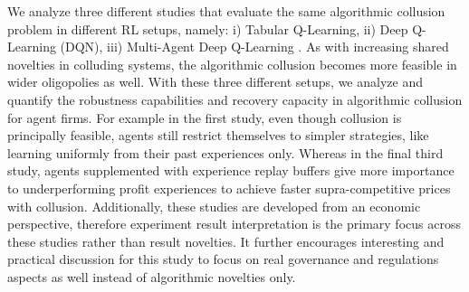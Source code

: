 \documentclass{article}
\begin{document}


We analyze three different studies that evaluate the same algorithmic collusion problem in different RL setups, namely: i) Tabular Q-Learning, ii) Deep Q-Learning (DQN), iii) Multi-Agent Deep Q-Learning \cite{eschenbaum2022robust, hettich2021algorithmic, han2021understanding}.
As with increasing shared novelties in colluding systems, the algorithmic collusion becomes more feasible in wider oligopolies as well.
With these three different setups, we analyze and quantify the robustness capabilities and recovery capacity in algorithmic collusion for agent firms.
For example in the first study, even though collusion is principally feasible, agents still restrict themselves to simpler strategies, like learning uniformly from their past experiences only.
Whereas in the final third study, agents supplemented with experience replay buffers give more importance to underperforming profit experiences to achieve faster supra-competitive prices with collusion.
Additionally, these studies are developed from an economic perspective, therefore experiment result interpretation is the primary focus across these studies rather than result novelties.
It further encourages interesting and practical discussion for this study to focus on real governance and regulations aspects as well instead of algorithmic novelties only.
\end{document}
